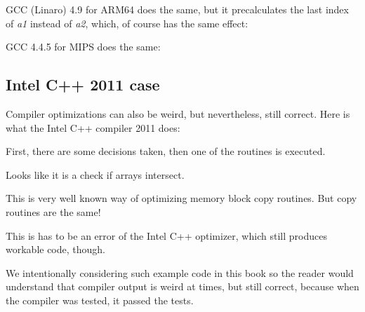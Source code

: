 

GCC (Linaro) 4.9 for ARM64 does the same, but it precalculates the last index of \emph{a1} 
instead of \emph{a2}, which, of course has the same effect:




GCC 4.4.5 for MIPS does the same:



\subsection{Intel C++ 2011 case}
\myindex{\CompilerAnomaly}
\label{loops_iterators_loop_anomaly}

Compiler optimizations can also be weird, but nevertheless, still correct.
Here is what the Intel C++ compiler 2011 does:



First, there are some decisions taken, then one of the routines is executed.

Looks like it is a check if arrays intersect.

This is very well known way of optimizing memory block copy routines.
But copy routines are the same!

This is has to be an error of the Intel C++ optimizer, which still produces workable code, though.

We intentionally considering such example code in this book so the reader would understand that compiler output is weird at times,
but still correct, because when the compiler was tested, it passed the tests.
